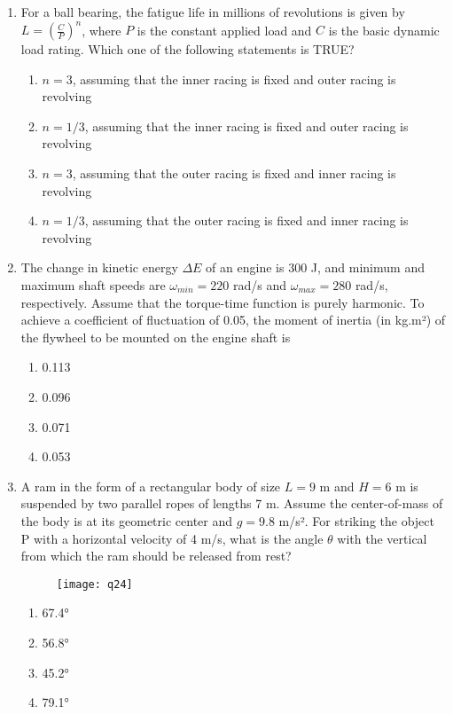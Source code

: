 \documentclass[journal,11pt,onecolumn]{IEEEtran}
\begin{document}
\begin{enumerate}[resume]
    \item For a ball bearing, the fatigue life in millions of revolutions is given by $L = \left(\frac{C}{P}\right)^{n}$, where $P$ is the constant applied load and $C$ is the basic dynamic load rating. Which one of the following statements is TRUE?

          \begin{enumerate}
              \item $n = 3$, assuming that the inner racing is fixed and outer racing is revolving
              \item $n = 1/3$, assuming that the inner racing is fixed and outer racing is revolving
              \item $n = 3$, assuming that the outer racing is fixed and inner racing is revolving
              \item $n = 1/3$, assuming that the outer racing is fixed and inner racing is revolving
          \end{enumerate}

    \item The change in kinetic energy $\Delta E$ of an engine is 300 J, and minimum and maximum shaft speeds are $\omega_{min} = 220$ rad/s and $\omega_{max} = 280$ rad/s, respectively. Assume that the torque-time function is purely harmonic. To achieve a coefficient of fluctuation of 0.05, the moment of inertia (in kg.m²) of the flywheel to be mounted on the engine shaft is

          \begin{enumerate}
              \item 0.113
              \item 0.096
              \item 0.071
              \item 0.053
          \end{enumerate}

    \item A ram in the form of a rectangular body of size $L = 9$ m and $H = 6$ m is suspended by two parallel ropes of lengths 7 m. Assume the center-of-mass of the body is at its geometric center and $g = 9.8$ m/s². For striking the object P with a horizontal velocity of 4 m/s, what is the angle $\theta$ with the vertical from which the ram should be released from rest?
          \begin{figure}[H]
              \centering
              \texttt{[image: q24]}
              \caption{}
              \label{fig:q24}
          \end{figure}
          \begin{enumerate}
              \item 67.4°
              \item 56.8°
              \item 45.2°
              \item 79.1°
          \end{enumerate}


\end{enumerate}
\end{document}
